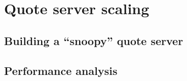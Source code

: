 \section{Quote server scaling}

\subsection{Building a ``snoopy'' quote server}

\subsection{Performance analysis}
